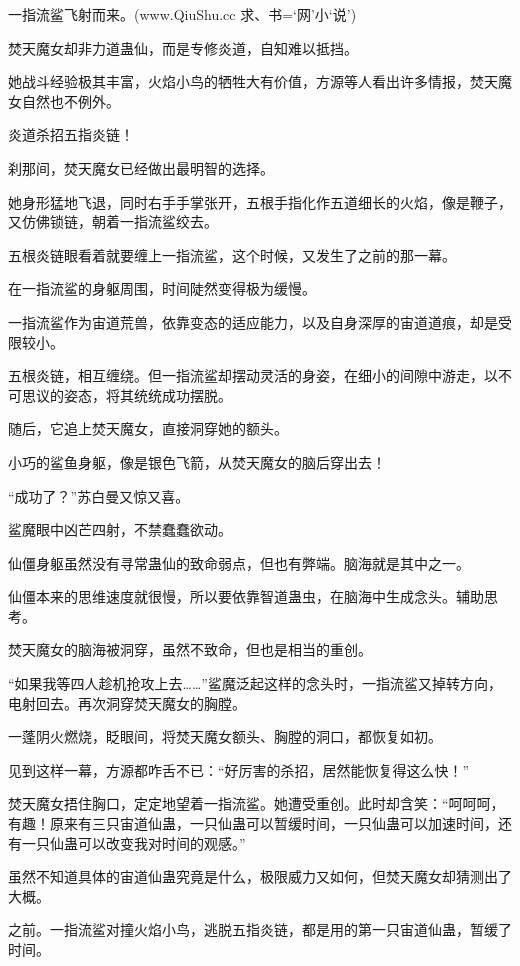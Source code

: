 
\begin{this_body}

一指流鲨飞射而来。(www.QiuShu.cc 求、书=‘网’小‘说’)

焚天魔女却非力道蛊仙，而是专修炎道，自知难以抵挡。

她战斗经验极其丰富，火焰小鸟的牺牲大有价值，方源等人看出许多情报，焚天魔女自然也不例外。

炎道杀招五指炎链！

刹那间，焚天魔女已经做出最明智的选择。

她身形猛地飞退，同时右手手掌张开，五根手指化作五道细长的火焰，像是鞭子，又仿佛锁链，朝着一指流鲨绞去。

五根炎链眼看着就要缠上一指流鲨，这个时候，又发生了之前的那一幕。

在一指流鲨的身躯周围，时间陡然变得极为缓慢。

一指流鲨作为宙道荒兽，依靠变态的适应能力，以及自身深厚的宙道道痕，却是受限较小。

五根炎链，相互缠绕。但一指流鲨却摆动灵活的身姿，在细小的间隙中游走，以不可思议的姿态，将其统统成功摆脱。

随后，它追上焚天魔女，直接洞穿她的额头。

小巧的鲨鱼身躯，像是银色飞箭，从焚天魔女的脑后穿出去！

“成功了？”苏白曼又惊又喜。

鲨魔眼中凶芒四射，不禁蠢蠢欲动。

仙僵身躯虽然没有寻常蛊仙的致命弱点，但也有弊端。脑海就是其中之一。

仙僵本来的思维速度就很慢，所以要依靠智道蛊虫，在脑海中生成念头。辅助思考。

焚天魔女的脑海被洞穿，虽然不致命，但也是相当的重创。

“如果我等四人趁机抢攻上去……”鲨魔泛起这样的念头时，一指流鲨又掉转方向，电射回去。再次洞穿焚天魔女的胸膛。

一蓬阴火燃烧，眨眼间，将焚天魔女额头、胸膛的洞口，都恢复如初。

见到这样一幕，方源都咋舌不已：“好厉害的杀招，居然能恢复得这么快！”

焚天魔女捂住胸口，定定地望着一指流鲨。她遭受重创。此时却含笑：“呵呵呵，有趣！原来有三只宙道仙蛊，一只仙蛊可以暂缓时间，一只仙蛊可以加速时间，还有一只仙蛊可以改变我对时间的观感。”

虽然不知道具体的宙道仙蛊究竟是什么，极限威力又如何，但焚天魔女却猜测出了大概。

之前。一指流鲨对撞火焰小鸟，逃脱五指炎链，都是用的第一只宙道仙蛊，暂缓了时间。


\end{this_body}
